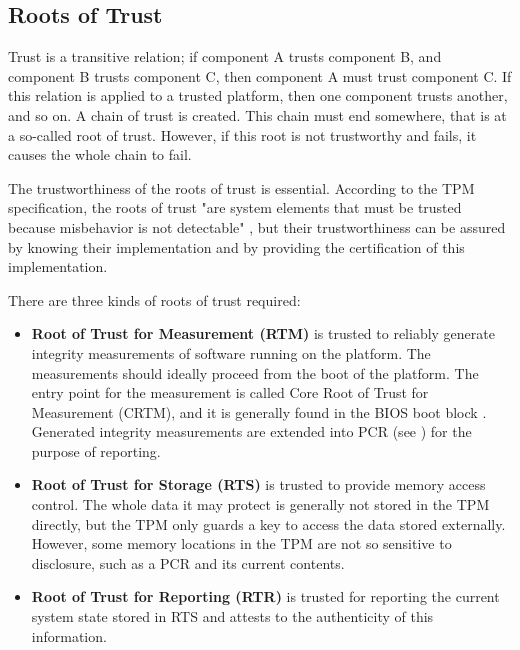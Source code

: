 \subsection{Roots of Trust}
Trust is a transitive relation; if component A trusts component B, and component B trusts component C, then component A must trust component C. If this relation is applied to a trusted platform, then one component trusts another, and so on. A chain of trust is created. This chain must end somewhere, that is at a so-called root of trust. However, if this root is not trustworthy and fails, it causes the whole chain to fail.

The trustworthiness of the roots of trust is essential. According to the TPM specification, the roots of trust "are system elements that must be trusted because misbehavior is not detectable" \cite[p.~23]{tcg_p1_architecture}, but their trustworthiness can be assured by knowing their implementation and by providing the certification of this implementation.

\clearpage
There are three kinds of roots of trust required:
\begin{itemize}
    \item \textbf{Root of Trust for Measurement (RTM)} is trusted to reliably generate integrity measurements of software running on the platform. The measurements should ideally proceed from the boot of the platform. The entry point for the measurement is called Core Root of Trust for Measurement (CRTM), and it is generally found in the BIOS boot block \cite[p.~185]{Tomlinson2017}. Generated integrity measurements are extended into PCR (see ) for the purpose of reporting.
    \item \textbf{Root of Trust for Storage (RTS)} is trusted to provide memory access control. The whole data it may protect is generally not stored in the TPM directly, but the TPM only guards a key to access the data stored externally. However, some memory locations in the TPM are not so sensitive to disclosure, such as a PCR and its current contents. 
    \item \textbf{Root of Trust for Reporting (RTR)} is trusted for reporting the current system state stored in RTS and attests to the authenticity of this information.
\end{itemize}

